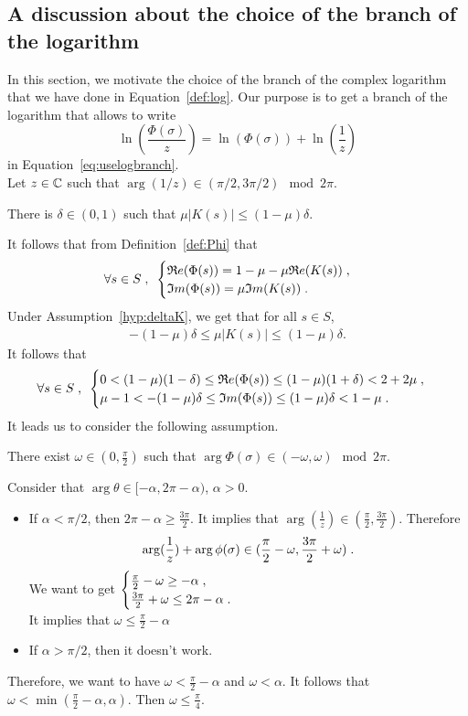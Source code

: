 \documentclass[11pt]{amsart}
\renewcommand{\Re}{\mathfrak{R}e}
\renewcommand{\Im}{\mathfrak{I}m}
\begin{document}
\subsection{A discussion about the choice of the branch of the logarithm}
In this section, we motivate the choice of the branch of the complex logarithm that we have done in Equation~\eqref{def:log}. Our purpose is to get a branch of the logarithm that allows to write 
    $$ \ln(\frac{\Phi(\sigma)}{z}) = \ln(\Phi(\sigma)) + \ln(\frac{1}{z})$$
in Equation~\eqref{eq:uselogbranch}. \\

Let $z \in \mathbb{C}$ such that $\arg(1/z) \in (\pi/2, 3\pi/2) \mod 2\pi$.
\begin{hypothesis}
    There is $\delta \in (0,1)$ such that $ \mu |K(s)| \leq (1-\mu)\delta$.
    \label{hyp:deltaK}
\end{hypothesis}
It follows that from Definition~\eqref{def:Phi} that 
$$\forall s \in S \eqsepv 
\begin{cases}
    \Re(\Phi(s)) = 1-\mu-\mu \Re(K(s))\eqsepv \\
    \Im(\Phi(s)) = \mu \Im(K(s))\eqfinp
\end{cases}
$$
Under Assumption~\ref{hyp:deltaK}, we get that for all $s \in S$, 
    \begin{align*}
     -(1-\mu)\delta \leq \mu |K(s)| \leq (1-\mu)\delta.
    \end{align*}
It follows that
$$\forall s \in S \eqsepv 
\begin{cases}
    0 < (1-\mu)(1-\delta) \leq \Re(\Phi(s)) \leq (1-\mu)(1+\delta) < 2 + 2\mu \eqfinv
    \\ 
   \mu-1 < -(1-\mu) \delta \leq \Im(\Phi(s)) \leq (1-\mu) \delta < 1-\mu \eqfinp
\end{cases}
$$
It leads us to consider the following assumption.
\begin{hypothesis}
There exist $\omega \in \left(0, \frac\pi2 \right)$ such that $\arg\Phi(\sigma) \in (-\omega, \omega) \mod 2\pi$.   
\end{hypothesis}

Consider that $\arg \theta \in [-\alpha, 2\pi-\alpha)$, $\alpha > 0$.
\begin{itemize}
    \item If $\alpha < \pi / 2$, then 
    $2\pi - \alpha \geq \frac{3\pi}{2}$. It implies that $\arg(\frac1z) \in (\frac\pi2, \frac{3\pi}{2})$. Therefore
    $$ \arg(\frac1z) + \arg \phi(\sigma) \in (\frac\pi2 - \omega, \frac{3\pi}{2}+\omega)\; .$$
    We want to get 
    $\begin{cases}
        \frac{\pi}{2}-\omega \geq - \alpha \; , \enspace
        \\
        \frac{3\pi}{2}+\omega \leq 2\pi-\alpha \; .
    \end{cases}$ \\
    It implies that $\omega \leq \frac{\pi}{2}-\alpha$
    \item If $\alpha > \pi / 2$, then it doesn't work. 
\end{itemize}
Therefore, we want to have $ \omega < \frac{\pi}{2}-\alpha$ and $\omega < \alpha$.
It follows that $\omega < \min(\frac\pi2 - \alpha, \alpha)$. Then $\omega \leq \frac\pi4$.  
\end{document}
